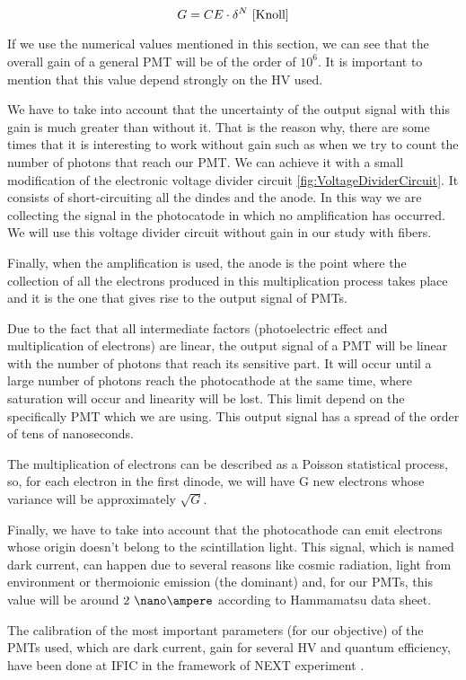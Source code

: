 \begin{itemize}
\begin{equation}
G = CE\cdot{} \delta^N~\cite{Knoll}
\label{eq:PMTGain}
\end{equation}


If we use the numerical values mentioned in this section, we can see that the overall gain of a general PMT will be of the order of $10^6$. It is important to mention that this value depend strongly on the HV used.

We have to take into account that the uncertainty of the output signal with this gain is much greater than without it. That is the reason why, there are some times that it is interesting to work without gain such as when we try to count the number of photons that reach our PMT. We can achieve it with a small modification of the electronic voltage divider circuit \ref{fig:VoltageDividerCircuit}. It consists of short-circuiting all the dindes and the anode. In this way we are collecting the signal in the photocatode in which no amplification has occurred. We will use this voltage divider circuit without gain in our study with fibers.

Finally, when the amplification is used, the anode is the point where the collection of all the electrons produced in this multiplication process takes place and it is the one that gives rise to the output signal of PMTs. 

\end{itemize}

Due to the fact that all intermediate factors (photoelectric effect and multiplication of electrons) are linear, the output signal of a PMT will be linear with the number of photons that reach its sensitive part. It will occur until a large number of photons reach the photocathode at the same time, where saturation will occur and linearity will be lost. This limit depend on the specifically PMT which we are using. This output signal has a spread of the order of tens of nanoseconds.

The multiplication of electrons can be described as a Poisson statistical process, so, for each electron in the first dinode, we will have G new electrons whose variance will be approximately $\sqrt{G}$.

Finally, we have to take into account that the photocathode can emit electrons whose origin doesn't belong to the scintillation light. This signal, which is named dark current, can  happen due to several reasons like cosmic radiation, light from environment or thermoionic emission (the dominant) and, for our PMTs, this value will be around $2~\nano\ampere$ according to Hammamatsu data sheet.

The calibration of the most important parameters (for our objective) of the PMTs used, which are dark current, gain for several HV and quantum efficiency,  have been done at IFIC in the framework of NEXT experiment \cite{CalibrationPMTsNEXT}. 